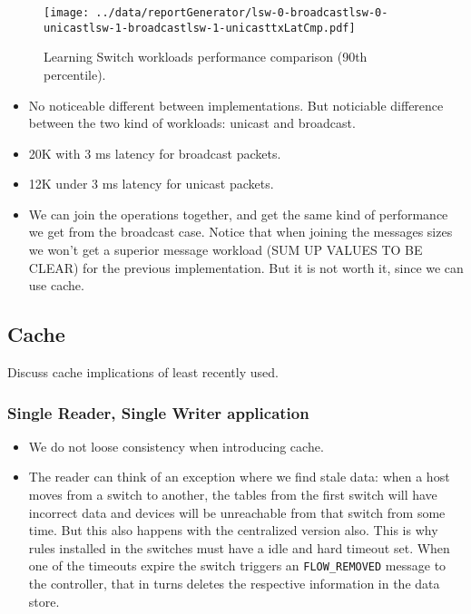 \begin{figure}[ht]
\centering
\texttt{[image: ../data/reportGenerator/lsw-0-broadcastlsw-0-unicastlsw-1-broadcastlsw-1-unicasttxLatCmp.pdf]}
\caption[Learning Switch workloads performance comparison]{Learning Switch workloads performance comparison (90th percentile). }
\end{figure}

\begin{itemize}
\item No noticeable  different between implementations. But noticiable
  difference between the two kind of workloads: unicast and
  broadcast. 
\item 20K with 3 ms latency for broadcast packets. 
\item 12K under 3 ms latency for unicast packets. 

\item We can join the operations together, and get the same kind of
  performance we get from the broadcast case. Notice that when joining the
  messages sizes we won't get a superior message workload (SUM UP
  VALUES TO BE CLEAR) for the previous implementation. But it is not
  worth it, since we can use cache.
\end{itemize}

\subsection{Cache}

\label{sec.learning.switch.lru.cache} Discuss cache implications of
least recently used. 

\subsubsection{Single Reader, Single Writer application}
\begin{itemize}
\item We do not loose consistency when introducing cache.
\item The reader can think of an exception where we find stale data:
  when a host moves from a switch to another, the tables from the
  first switch will have 
  incorrect data and devices will be unreachable from that switch from
  some time. But this also happens with the centralized version
  also. This is why rules installed in the switches must have a idle
  and hard timeout set. When one of the timeouts expire the switch triggers
  an \texttt{FLOW\_REMOVED} message to the controller, that in turns
  deletes the respective information in the data store. 


\end{itemize}


